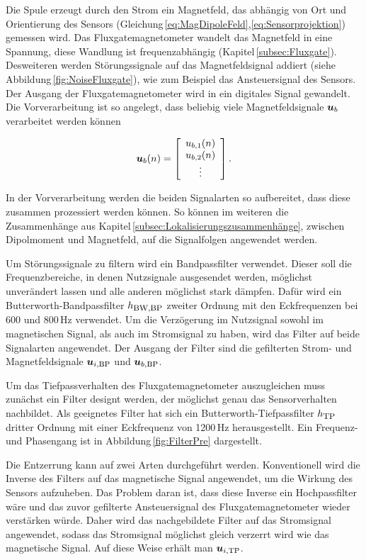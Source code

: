 Die Spule erzeugt durch den Strom ein Magnetfeld, das abhängig von Ort und Orientierung des Sensors (Gleichung\,\ref{eq:MagDipoleFeld},\ref{eq:Sensorprojektion}) gemessen wird. Das Fluxgatemagnetometer wandelt das Magnetfeld in eine Spannung, diese Wandlung ist frequenzabhängig (Kapitel\,\ref{subsec:Fluxgate}). Desweiteren werden Störungssignale auf das Magnetfeldsignal addiert (siehe Abbildung\,\ref{fig:NoiseFluxgate}), wie zum Beispiel das Ansteuersignal des Sensors. Der Ausgang der Fluxgatemagnetometer wird in ein digitales Signal gewandelt. Die Vorverarbeitung ist so angelegt, dass beliebig viele Magnetfeldsignale $\mbox{\boldmath ${u}$}_{b}$ verarbeitet werden können

\begin{equation}
    \mbox{\boldmath ${u}$}_{b}(n) = \left[\begin{array}{c} u_{b,1}(n)\\ u_{b,2}(n)\\ \vdots \end{array}\right].
\end{equation}

In der Vorverarbeitung werden die beiden Signalarten so aufbereitet, dass diese zusammen prozessiert werden können. So können im weiteren die Zusammenhänge aus Kapitel\,\ref{subsec:Lokalisierungszusammenhänge}, zwischen Dipolmoment und Magnetfeld, auf die Signalfolgen angewendet werden.

Um Störungssignale zu filtern wird ein Bandpassfilter verwendet. Dieser soll die Frequenzbereiche, in denen Nutzsignale ausgesendet werden, möglichst unverändert lassen und alle anderen möglichst stark dämpfen. Dafür wird ein Butterworth-Bandpassfilter $h_{\textrm{\footnotesize{BW,BP}}}$ zweiter Ordnung mit den Eckfrequenzen bei 600 und 800\,Hz verwendet. Um die Verzögerung im Nutzsignal sowohl im magnetischen Signal, als auch im Stromsignal zu haben, wird das Filter auf beide Signalarten angewendet. Der Ausgang der Filter sind die gefilterten Strom- und Magnetfeldsignale $\mbox{\boldmath ${u}$}_{i,\text{BP}}$ und $\mbox{\boldmath ${u}$}_{b,\text{BP}}$.

Um das Tiefpassverhalten des Fluxgatemagnetometer auszugleichen muss zunächst ein Filter designt werden, der möglichst genau das Sensorverhalten nachbildet. Als geeignetes Filter hat sich ein Butterworth-Tiefpassfilter $h_{\textrm{\footnotesize{TP}}}$ dritter Ordnung mit einer Eckfrequenz von 1200\,Hz herausgestellt. Ein Frequenz-und Phasengang ist in Abbildung\,\ref{fig:FilterPre} dargestellt.

Die Entzerrung kann auf zwei Arten durchgeführt werden. Konventionell wird die Inverse des Filters auf das magnetische Signal angewendet, um die Wirkung des Sensors aufzuheben. Das Problem daran ist, dass diese Inverse ein Hochpassfilter wäre und das zuvor gefilterte Ansteuersignal des Fluxgatemagnetometer wieder verstärken würde. Daher wird das nachgebildete Filter auf das Stromsignal angewendet, sodass das Stromsignal möglichst gleich verzerrt wird wie das magnetische Signal. Auf diese Weise erhält man $\mbox{\boldmath ${u}$}_{i,\text{TP}}$.

